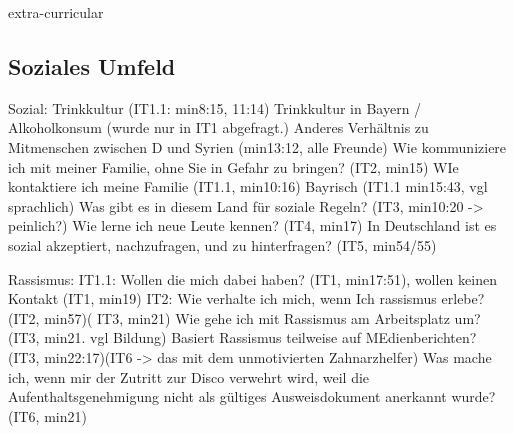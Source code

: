 	\item [soziales Umfeld]
		extra-curricular
		
\subsection{Soziales Umfeld}

    Sozial:
    Trinkkultur (IT1.1: min8:15, 11:14)
        Trinkkultur in Bayern / Alkoholkonsum (wurde nur in IT1 abgefragt.)
    Anderes Verhältnis zu Mitmenschen zwischen D und Syrien (min13:12, alle Freunde)
    Wie kommuniziere ich mit meiner Familie, ohne Sie in Gefahr zu    bringen? (IT2, min15)
    WIe kontaktiere ich meine Familie (IT1.1, min10:16)
    Bayrisch (IT1.1 min15:43, vgl sprachlich)
    Was gibt es in diesem Land für soziale Regeln? (IT3, min10:20 -> peinlich?)
    Wie lerne ich neue Leute kennen? (IT4, min17)
        In Deutschland ist es sozial akzeptiert, nachzufragen, und zu hinterfragen? (IT5, min54/55)

Rassismus:
    IT1.1: Wollen die mich dabei haben? (IT1, min17:51), wollen keinen Kontakt (IT1, min19)
    IT2: Wie verhalte ich mich, wenn Ich rassismus erlebe? (IT2, min57)( IT3, min21)
    Wie gehe ich mit Rassismus am Arbeitsplatz um? (IT3, min21. vgl Bildung)
    Basiert Rassismus teilweise auf MEdienberichten? (IT3, min22:17)(IT6 -> das mit dem unmotivierten Zahnarzhelfer)
    Was mache ich, wenn mir der Zutritt zur Disco verwehrt wird, weil die Aufenthaltsgenehmigung nicht als gültiges Ausweisdokument anerkannt wurde? (IT6, min21)